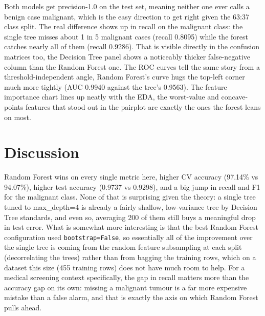 \documentclass[12pt,a4paper]{article}
\begin{document}
Both models get precision-1.0 on the test set, meaning neither one ever calls a benign case
malignant, which is the easy direction to get right given the 63:37 class split. The real
difference shows up in recall on the malignant class: the single tree misses about 1 in 5 malignant
cases (recall 0.8095) while the forest catches nearly all of them (recall 0.9286). That is visible
directly in the confusion matrices too, the Decision Tree panel shows a noticeably thicker
false-negative column than the Random Forest one. The ROC curves tell the same story from a
threshold-independent angle, Random Forest's curve hugs the top-left corner much more tightly
(AUC 0.9940 against the tree's 0.9563). The feature importance chart lines up neatly with the EDA,
the worst-value and concave-points features that stood out in the pairplot are exactly the ones the
forest leans on most.

\section{Discussion}
Random Forest wins on every single metric here, higher CV accuracy (97.14\% vs 94.07\%), higher test
accuracy (0.9737 vs 0.9298), and a big jump in recall and F1 for the malignant class. None of that is
surprising given the theory: a single tree tuned to max\_depth=4 is already a fairly shallow,
low-variance tree by Decision Tree standards, and even so, averaging 200 of them still buys a
meaningful drop in test error. What is somewhat more interesting is that the best Random Forest
configuration used \texttt{bootstrap=False}, so essentially all of the improvement over the single
tree is coming from the random feature subsampling at each split (decorrelating the trees) rather
than from bagging the training rows, which on a dataset this size (455 training rows) does not have
much room to help. For a medical screening context specifically, the gap in recall matters more than
the accuracy gap on its own: missing a malignant tumour is a far more expensive mistake than a false
alarm, and that is exactly the axis on which Random Forest pulls ahead.
\end{document}
